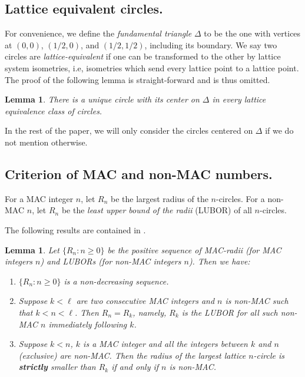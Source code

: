 \documentclass{article}
\theoremstyle{theorem}
\newtheorem{lemma}[theorem]{Lemma}
\theoremstyle{definition}
\begin{document}
\subsection{Lattice equivalent circles.}
For convenience, we define the \emph{fundamental triangle} $\Delta$ to be the one with vertices at $(0,0)$, $(1/2,0)$, and $(1/2,1/2)$, including its boundary. We say two circles are \emph{lattice-equivalent} if one can be transformed to the other by lattice system isometries, i.e, isometries which send every lattice point to a lattice point. The proof of the following lemma is straight-forward and is thus omitted.

\begin{lemma}\label{lem:inDelta}
There is a unique circle with its center on $\Delta$ in every lattice equivalence class of circles.
\end{lemma}

In the rest of the paper, we will only consider the circles centered on $\Delta$ if we do not mention otherwise.


\subsection{Criterion of MAC and non-MAC numbers.}
For a MAC integer $n$, let $R_n$ be the largest radius of the $n$-circles. For a non-MAC $n$, let $R_n$ be the \emph{least upper bound of the radii} (LUBOR) of all $n$-circles.

The following results are contained in \cite[Main Theorem]{Zhao2025Aug}.

\begin{lemma}\label{lem:main}
Let $\{R_n: n\ge 0\}$ be the positive sequence of MAC-radii (for MAC integers $n$) and LUBORs (for non-MAC integers $n$).
Then we have:
\begin{enumerate}
  \item[(a)] $\{R_n: n\ge 0\}$ is a non-decreasing sequence.

  \item[(b)] Suppose $k<\ell$ are two consecutive MAC integers and $n$ is non-MAC such that $k<n<\ell$. Then $R_n=R_k$, namely, $R_k$ is the LUBOR for all such non-MAC $n$ immediately following $k$.

  \item[(c)] Suppose $k<n$, $k$ is a MAC integer and all the integers between $k$ and $n$ (exclusive) are non-MAC. Then the radius of the largest lattice $n$-circle is \textbf{strictly} smaller than $R_k$ if and only if $n$ is non-MAC.
\end{enumerate}
\end{lemma}
\end{document}
